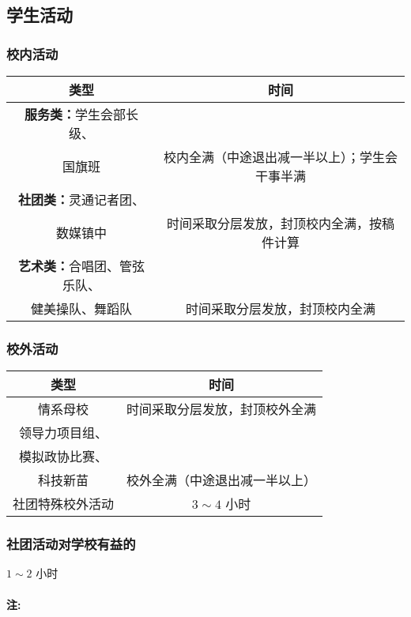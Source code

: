 \documentclass{article}
\begin{document}
\subsection{学生活动}

\subsubsection*{校内活动}

\begin{tabular}{cc}
  \hline
  \textbf{类型} & \textbf{时间} \\
  \hline
  \textbf{服务类：}学生会部长级、\\国旗班 & 校内全满（中途退出减一半以上）；学生会干事半满 \\
  \hline
  \textbf{社团类：}灵通记者团、\\数媒镇中 & 时间采取分层发放，封顶校内全满，按稿件计算 \\
  \hline
  \textbf{艺术类：}合唱团、管弦乐队、\\健美操队、舞蹈队 & 时间采取分层发放，封顶校内全满 \\
  \hline
\end{tabular}

\subsubsection*{校外活动}

\begin{tabular}{cc}
  \hline
  \textbf{类型} & \textbf{时间} \\
  \hline
  情系母校 & 时间采取分层发放，封顶校外全满 \\
  \hline
  领导力项目组、\\模拟政协比赛、\\科技新苗 & 校外全满（中途退出减一半以上） \\
  \hline
  社团特殊校外活动 & $3 \sim 4$ 小时 \\
  \hline
\end{tabular}

\subsubsection*{社团活动对学校有益的}

$1 \sim 2$ 小时

\paragraph{注:}
\end{document}
